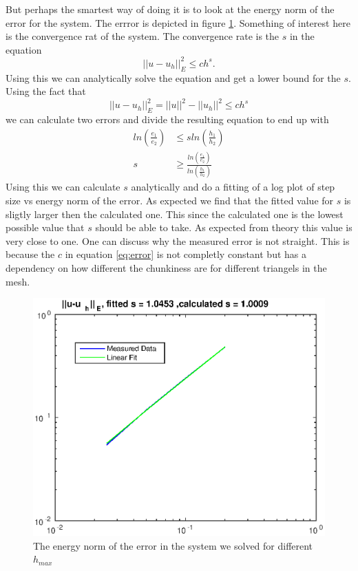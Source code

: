 \documentclass[11pt]{article}
\begin{document}
But perhaps the smartest way of doing it is to look at the energy norm of the error for the system. The errror is depicted in figure \ref{fig:ex4error}. Something of interest here is the convergence rat of the system. The convergence rate is the $s$ in the equation
\begin{equation}
	||u-u_h||^2_E \leq c h^s.
	\label{eq:errorBounds}
\end{equation}
Using this we can analytically solve the equation and get a lower bound for the $s$. Using the fact that 
\begin{equation}
	||u-u_h||^2_E = ||u||^2 - ||u_h||^2 \leq c h^s \label{eq:error}
\end{equation}
we can calculate two errors and divide the resulting equation to end up with 
\begin{align}
	ln(\frac{e_1}{e_2}) &\leq s ln(\frac{h_1}{h_2}) \\
	s &\geq \frac{ln(\frac{e_1}{e_2})}{ln(\frac{h_1}{h_2})} \label{eq:findS}
\end{align}
Using this we can calculate $s$ analytically and do a fitting of a log plot of step size vs energy norm of the error. As expected we find that the fitted value for $s$ is sligtly larger then the calculated one. This since the calculated one is the lowest possible value that $s$ should be able to take. As expected from theory this value is very close to one. One can discuss why the measured error is not straight. This is because the $c$ in equation \ref{eq:error} is not completly constant but has a dependency on how different the chunkiness are for different triangels in the mesh. 
\begin{figure}[H]
	\centering
	\includegraphics[width=1\textwidth]{../ex4/error}
	\caption{The energy norm of the error in the system we solved for different $h_{max}$}
	\label{fig:ex4error}
\end{figure}
\newpage
\end{document}
